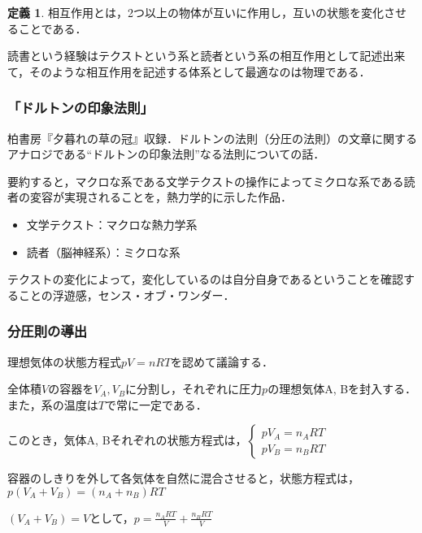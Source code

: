 \documentclass[10pt, a5paper, twoside]{jsarticle}
\theoremstyle{definition}
\newtheorem{dfn}{定義}
\begin{document}
			\begin{dfn}

				相互作用とは，2つ以上の物体が互いに作用し，互いの状態を変化させることである．
			
			\end{dfn}

			読書という経験はテクストという系と読者という系の相互作用として記述出来て，そのような相互作用を記述する体系として最適なのは物理である．

			\subsubsection{「ドルトンの印象法則」}

				柏書房『夕暮れの草の冠』収録．ドルトンの法則（分圧の法則）の文章に関するアナロジである“ドルトンの印象法則”なる法則についての話．

				要約すると，マクロな系である文学テクストの操作によってミクロな系である読者の変容が実現されることを，熱力学的に示した作品．

				\begin{itemize}

					\item 文学テクスト：マクロな熱力学系

					\item 読者（脳神経系）：ミクロな系

				\end{itemize}

				テクストの変化によって，変化しているのは自分自身であるということを確認することの浮遊感，センス・オブ・ワンダー．

			\subsubsection*{分圧則の導出}

				理想気体の状態方程式$ pV = nRT $を認めて議論する．

				全体積$ V $の容器を$ V_A , V_B $に分割し，それぞれに圧力$ p $の理想気体A, Bを封入する．また，系の温度は$ T $で常に一定である．

				このとき，気体A, Bそれぞれの状態方程式は，$ \begin{cases} p V_A = n_A R T \\ p V_B = n_B R T \end{cases} $

				容器のしきりを外して各気体を自然に混合させると，状態方程式は，$ p (V_A + V_B) = (n_A + n_B) RT$

				$ (V_A + V_B) = V $として，$ p = \frac{n_A R T}{V} + \frac{n_B R T}{V} $
\end{document}

